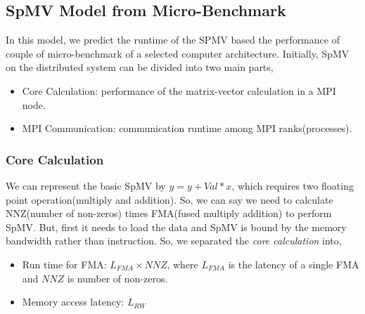 \documentclass[conference, 10ppt]{IEEEtran}
\begin{document}
\subsection{SpMV Model from Micro-Benchmark}
In this model, we predict the runtime of the SPMV based the performance of couple of micro-benchmark of 
a selected computer architecture. Initially, SpMV on the distributed system can be divided into two main parts,
\begin{itemize}
\item Core Calculation: performance of the matrix-vector calculation in a MPI node.
\item MPI Communication: communication runtime among MPI ranks(processes). 
\end{itemize}
\subsubsection{Core Calculation}
We can represent the basic SpMV by $y=y+Val*x$, which requires two floating point operation(multiply and addition). 
So, we can say we need to calculate NNZ(number of non-zeros) times FMA(fused multiply addition) to perform SpMV.
But, first it needs to load the data and SpMV is bound by the memory bandwidth rather than instruction. So, we 
separated the \textit{core calculation} into,
\begin{itemize}
\item Run time for FMA: $L_{FMA}\times NNZ$, where $L_{FMA}$ is the latency of a single FMA and $NNZ$ is number of non-zeros.
\item Memory access latency: $L_{RW}$
\end{itemize} 
\end{document}
